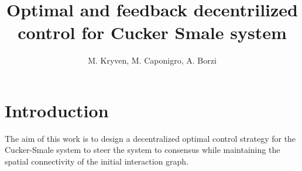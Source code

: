 \documentclass[a4paper,10pt, english]{article}
\begin{document}
\title{Optimal and feedback decentrilized control for Cucker Smale system}
\author{M. Kryven, M. Caponigro, A. Borzi}
\maketitle








\section{Introduction}
The aim of this work is to design a decentralized optimal control strategy for the Cucker-Smale system to steer the system to consensus while maintaining the spatial connectivity of the initial interaction graph.
\end{document}
